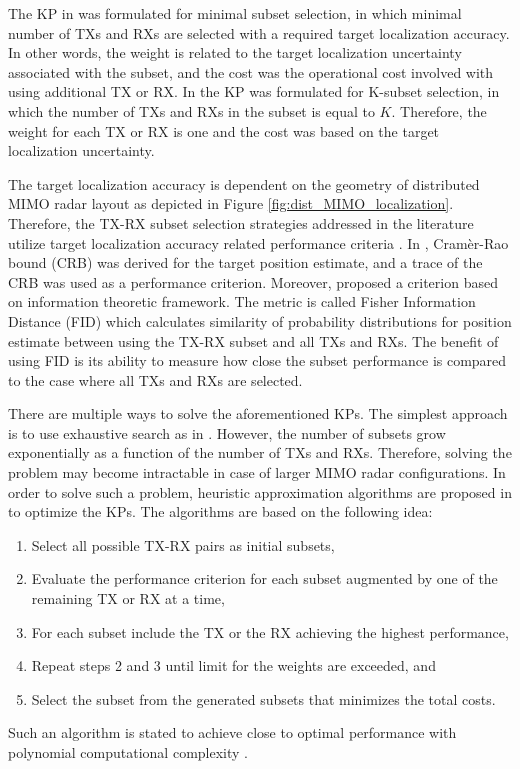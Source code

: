 \documentclass[english, 12pt, a4paper, elec, utf8, a-1b, online]{aaltothesis}
\begin{document}
The KP in \cite{Godrich2011a} was formulated for minimal subset selection, in which minimal number of TXs and RXs are selected with a required target localization accuracy.
In other words, the weight is related to the target localization uncertainty associated with the subset, and the cost was the operational cost involved with using additional TX or RX.
In \cite{Godrich2011} the KP was formulated for K-subset selection, in which the number of TXs and RXs in the subset is equal to $K$.
Therefore, the weight for each TX or RX is one and the cost was based on the target localization uncertainty.

The target localization accuracy is dependent on the geometry of distributed MIMO radar layout as depicted in Figure \ref{fig:dist_MIMO_localization}.
Therefore, the TX-RX subset selection strategies addressed in the literature utilize target localization accuracy related performance criteria \cite{Godrich2011a, Godrich2011a, Sun2014}. 
In \cite{Godrich2011a, Godrich2011}, Cram\`er-Rao bound (CRB) was derived for the target position estimate, and a trace of the CRB was used as a performance criterion.
Moreover, \cite{Sun2014} proposed a criterion based on information theoretic framework.
The metric is called Fisher Information Distance (FID) which calculates similarity of probability distributions for position estimate between using the TX-RX subset and all TXs and RXs.
The benefit of using FID is its ability to measure how close the subset performance is compared to the case where all TXs and RXs are selected.

There are multiple ways to solve the aforementioned KPs.
The simplest approach is to use exhaustive search as in \cite{Sun2014}.
However, the number of subsets grow exponentially as a function of the number of TXs and RXs.
Therefore, solving the problem may become intractable in case of larger MIMO radar configurations.
In order to solve such a problem, heuristic approximation algorithms are proposed in \cite{Godrich2011a, Godrich2011} to optimize the KPs.
The algorithms are based on the following idea:
\begin{enumerate}
    \item Select all possible TX-RX pairs as initial subsets,
    \item Evaluate the performance criterion for each subset augmented by one of the remaining TX or RX at a time, 
    \item For each subset include the TX or the RX achieving the highest performance,
    \item Repeat steps 2 and 3 until limit for the weights are exceeded, and
    \item Select the subset from the generated subsets that minimizes the total costs. 
\end{enumerate}
Such an algorithm is stated to achieve close to optimal performance with polynomial computational complexity \cite{Godrich2011a, Godrich2011}.
\end{document}
